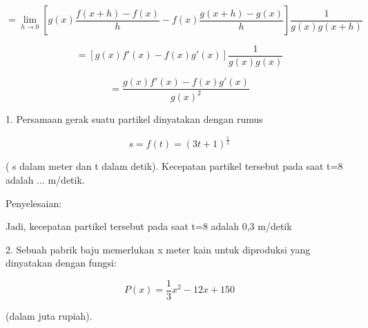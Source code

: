\documentclass[a4paper,10pt]{article}
\begin{document}
\begin{eulernotebook}
\begin{eulercomment}
\begin{eulercomment}
\begin{eulercomment}
\begin{eulercomment}
\begin{eulercomment}
\begin{eulercomment}
\begin{eulercomment}
\begin{eulercomment}
\begin{eulercomment}
\begin{eulercomment}
\begin{eulercomment}
\begin{eulercomment}
\begin{eulercomment}
\begin{eulercomment}
\begin{eulercomment}
\begin{eulercomment}
\begin{eulercomment}
\begin{eulercomment}
\begin{eulercomment}
\begin{eulercomment}
\begin{eulerformula}
\[
=\lim_{h\to 0} [g(x)\frac{f(x+h)-f(x)}{h}-f(x)\frac{g(x+h)-g(x)}{h}]\frac{1}{g(x)g(x+h)}
\]
\end{eulerformula}
\begin{eulerformula}
\[
=[g(x)f'(x)-f(x)g'(x)]\frac{1}{g(x)g(x)}
\]
\end{eulerformula}
\begin{eulerformula}
\[
=\frac{g(x)f'(x)-f(x)g'(x)}{g(x)^2}
\]
\end{eulerformula}
\begin{eulercomment}
\end{eulercomment}
\begin{eulercomment}
1. Persamaan gerak suatu partikel dinyatakan dengan rumus\\
\end{eulercomment}
\begin{eulerformula}
\[
s=f(t)=(3t+1)^{\frac{1}{2}}
\]
\end{eulerformula}
\begin{eulerttcomment}
   ( s dalam meter dan t dalam detik).
   Kecepatan partikel tersebut pada saat t=8 adalah ... m/detik.
\end{eulerttcomment}
\begin{eulercomment}
\end{eulercomment}
\begin{eulerttcomment}
   Penyelesaian:
\end{eulerttcomment}
\begin{eulerttcomment}
  Jadi, kecepatan partikel tersebut pada saat t=8 adalah 0,3 m/detik
\end{eulerttcomment}
\begin{eulercomment}
2. Sebuah pabrik baju memerlukan x meter kain untuk diproduksi yang
dinyatakan dengan fungsi:\\
\end{eulercomment}
\begin{eulerformula}
\[
P(x)={\frac{1}{3}}x^2-12x+150
\]
\end{eulerformula}
\begin{eulerttcomment}
   (dalam juta rupiah).

\end{eulerttcomment}
\end{eulercomment}
\end{eulercomment}
\end{eulercomment}
\end{eulercomment}
\end{eulercomment}
\end{eulercomment}
\end{eulercomment}
\end{eulercomment}
\end{eulercomment}
\end{eulercomment}
\end{eulercomment}
\end{eulercomment}
\end{eulercomment}
\end{eulercomment}
\end{eulercomment}
\end{eulercomment}
\end{eulercomment}
\end{eulercomment}
\end{eulercomment}
\end{eulercomment}
\end{eulernotebook}
\end{document}
